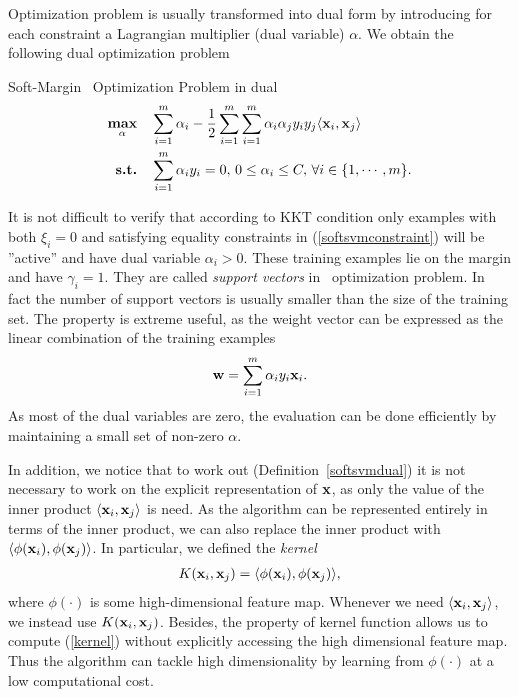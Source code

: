 Optimization problem is usually transformed into dual form by introducing for each constraint a Lagrangian multiplier (dual variable) $\alpha$.
We obtain the following dual optimization problem
\begin{definition}{Soft-Margin \svm\ Optimization Problem in dual}\label{softsvmdual}
	\begin{align*}
		\underset{\mathbf {\alpha}}{\textbf{max}} & \quad\sum_{i=1}^{m}\alpha_i -\frac{1}{2}\sum_{i=1}^{m}\sum_{i=1}^{m}\alpha_i\alpha_jy_iy_j\langle \mathbf {x}_i, \mathbf {x}_j \rangle\\
		\textbf{s.t.} & \quad \sum_{i=1}^{m}\alpha_iy_i=0, \, 0\le\alpha_i\le C, \, \forall i\in\{1,\cdots,m\}.
	\end{align*}
\end{definition}
It is not difficult to verify that according to KKT condition only examples with both $\xi_i=0$ and satisfying equality constraints in (\ref{softsvmconstraint}) will be ''active'' and have dual variable $\alpha_i>0$.
These training examples lie on the margin and have $\gamma_i=1$.
They are called \textit{support vectors} in \svm\ optimization problem.
In fact the number of support vectors is usually smaller than the size of the training set.
The property is extreme useful, as the weight vector can be expressed as the linear combination of the training examples
\begin{align*}
	\mathbf {w} = \sum_{i=1}^{m}\alpha_iy_i\mathbf {x}_i.
\end{align*}
As most of the dual variables are zero, the evaluation can be done efficiently by maintaining a small set of non-zero $\alpha$.

In addition, we notice that to work out (Definition~\ref{softsvmdual}) it is not necessary to work on the explicit representation of $\mathbf {x}$, as only the value of the inner product $\langle \mathbf {x}_i, \mathbf {x}_j \rangle$ is need.
As the algorithm can be represented entirely in terms of the inner product, we can also replace the inner product with $\langle \phi(\mathbf {x}_i), \phi(\mathbf {x}_j) \rangle$.
In particular, we defined the \textit{kernel}
\begin{align}
	K(\mathbf {x}_i,\mathbf {x}_j) = \langle \phi(\mathbf {x}_i), \phi(\mathbf {x}_j) \rangle, \label{kernel}
\end{align}
where $\phi(\cdot)$ is some high-dimensional feature map.
Whenever we need $\langle \mathbf {x}_i, \mathbf {x}_j \rangle$, we instead use $K(\mathbf {x}_i,\mathbf {x}_j)$.
Besides, the property of kernel function \citep{Scholkopf02learning} allows us to compute (\ref{kernel}) without explicitly accessing the high dimensional feature map.
Thus the algorithm can tackle high dimensionality by learning from $\phi(\cdot)$ at a low computational cost.

